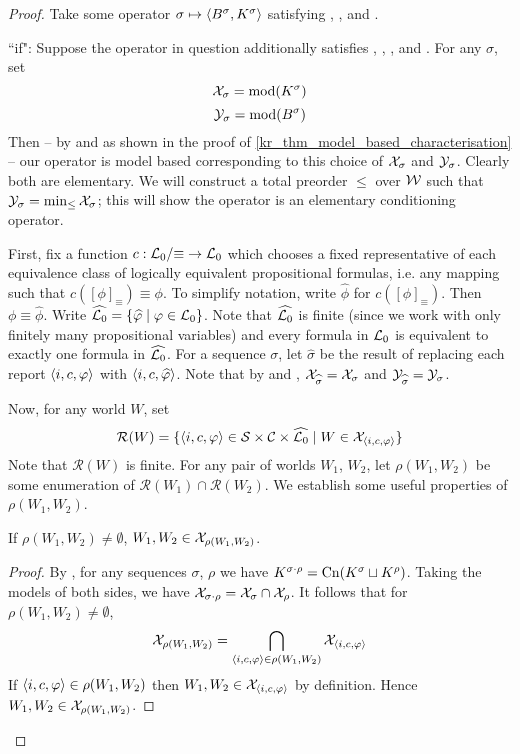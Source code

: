 \begin{proof}

Take some operator $\sigma \mapsto \langle {B^\sigma, K^\sigma} \rangle$ satisfying
\closure{}, \containment{}, \kconj{} and
\equivpost{}.

``if": Suppose the operator in question additionally satisfies
\rearr{}, \duprem{}, \condcons{},
\incvac{} and \acyc{}. For any $\sigma$, set
%
\[ \mathcal{X}_\sigma = \operatorname{mod}(K^\sigma) \] \[ \mathcal{Y}_\sigma = \operatorname{mod}(B^\sigma) \]
%
Then -- by \closure{} and \containment{} as shown in the proof of
\cref{kr_thm_model_based_characterisation} -- our operator is model based
corresponding to this choice of $\mathcal{X}_\sigma$ and $\mathcal{Y}_\sigma$. Clearly both are
elementary. We will construct a total preorder $\le$ over $\mathcal{W}$ such that
$\mathcal{Y}_\sigma = \min_{\le}{\mathcal{X}_\sigma}$; this will show the operator is an
elementary conditioning operator.

First, fix a function $c: \mathcal{L}{}_0 / {\equiv} \to \mathcal{L}{}_0$ which chooses a fixed
representative of each equivalence class of logically equivalent propositional
formulas, i.e. any mapping such that $c([\phi]_{\equiv}) \equiv \phi$. To
simplify notation, write $\widehat{\phi}$ for $c([\phi]_{\equiv})$. Then $\phi
\equiv \widehat{\phi}$. Write $\widehat{\mathcal{L}{}_0} = \{\widehat{\varphi} \mid \varphi
\in \mathcal{L}{}_0\}$.  Note that $\widehat{\mathcal{L}{}_0}$ is finite (since we work with only
finitely many propositional variables) and every formula in $\mathcal{L}{}_0$ is
equivalent to exactly one formula in $\widehat{\mathcal{L}{}_0}$. For a sequence
$\sigma$, let $\widehat{\sigma}$ be the result of replacing each report
$\langle {i, c, \varphi} \rangle$ with $\langle {i, c, \widehat{\varphi}} \rangle$. Note that by
\rearr{} and \equivpost{}, $\mathcal{X}_{\widehat{\sigma}} =
\mathcal{X}_\sigma$ and $\mathcal{Y}_{\widehat{\sigma}} = \mathcal{Y}_\sigma$.

Now, for any world $W$, set
\newcommand{\reports}{\mathcal{R}}
\[
    \reports(W)
    = \{
        \tuple{i, c, \phi}
        \in \srcs \times \C \times \widehat{\lprop}
        \mid
        W \in \X_{\tuple{i, c, \phi}}
    \}
\]
Note that $\reports(W)$ is finite. For any pair of worlds $W_1$, $W_2$, let
$\rho(W_1, W_2)$ be some enumeration of $\reports(W_1) \cap \reports(W_2)$. We
establish some useful properties of $\rho(W_1, W_2)$.

    \begin{claim}
        \label{kr_claim_w_j_in_rho}
        If $\rho(W_1, W_2) \ne \emptyset$, $W_1, W_2 \in \mathcal{X}_{\rho(W_1, W_2)}$.
    \end{claim}
    \begin{proof}
        By \kconj{}, for any sequences $\sigma$, $\rho$ we have
        $K^{\sigma \cdot \rho} = \operatorname{Cn}(K^\sigma \sqcup K^\rho)$.  Taking the
        models of both sides, we have $\mathcal{X}_{\sigma \cdot \rho} = \mathcal{X}_\sigma
        \cap \mathcal{X}_\rho$. It follows that for $\rho(W_1, W_2) \ne \emptyset$,
        \[
            \mathcal{X}_{\rho(W_1, W_2)}
            = \bigcap_{\langle {i, c, \varphi} \rangle \in \rho(W_1, W_2)}{\mathcal{X}_{\langle {i, c,
            \varphi} \rangle}}
        \]
        If $\langle {i, c, \varphi} \rangle \in \rho(W_1, W_2)$ then $W_1, W_2 \in
        \mathcal{X}_{\langle {i, c, \varphi} \rangle}$ by definition. Hence $W_1, W_2 \in
        \mathcal{X}_{\rho(W_1, W_2)}$.
    \end{proof}


\end{proof}
